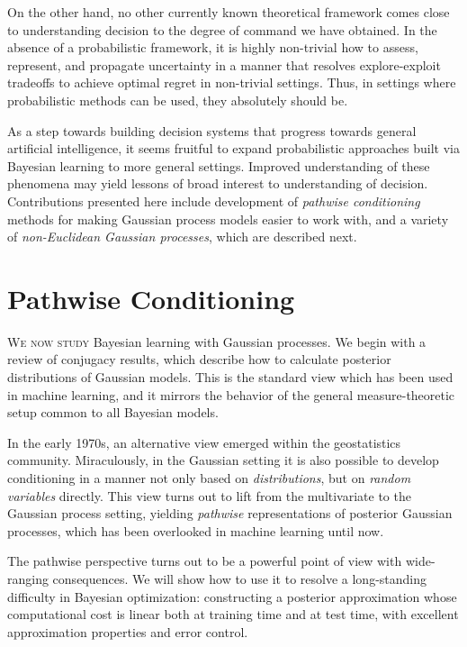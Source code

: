 \documentclass[11pt]{book}
\begin{document}
On the other hand, no other currently known theoretical framework comes close to understanding decision to the degree of command we have obtained.
In the absence of a probabilistic framework, it is highly non-trivial how to assess, represent, and propagate uncertainty in a manner that resolves explore-exploit tradeoffs to achieve optimal regret in non-trivial settings.
Thus, in settings where probabilistic methods can be used, they absolutely should be.

As a step towards building decision systems that progress towards general artificial intelligence, it seems fruitful to expand probabilistic approaches built via Bayesian learning to more general settings.
Improved understanding of these phenomena may yield lessons of broad interest to understanding of decision.
Contributions presented here include development of \emph{pathwise conditioning} methods for making Gaussian process models easier to work with, and a variety of \emph{non-Euclidean Gaussian processes}, which are described next.


\chapter{Pathwise Conditioning}
\label{ch:pathwise}

\lettrine{W}{e now study} Bayesian learning with Gaussian processes.
We begin with a review of conjugacy results, which describe how to calculate posterior distributions of Gaussian models.
This is the standard view which has been used in machine learning, and it mirrors the behavior of the general measure-theoretic setup common to all Bayesian models.

In the early 1970s, an alternative view emerged within the geostatistics community.
Miraculously, in the Gaussian setting it is also possible to develop conditioning in a manner not only based on \emph{distributions}, but on \emph{random variables} directly.
This view turns out to lift from the multivariate to the Gaussian process setting, yielding \emph{pathwise} representations of posterior Gaussian processes, which has been overlooked in machine learning until now.

The pathwise perspective turns out to be a powerful point of view with wide-ranging consequences.
We will show how to use it to resolve a long-standing difficulty in Bayesian optimization: constructing a posterior approximation whose computational cost is linear both at training time and at test time, with excellent approximation properties and error control.
\end{document}

